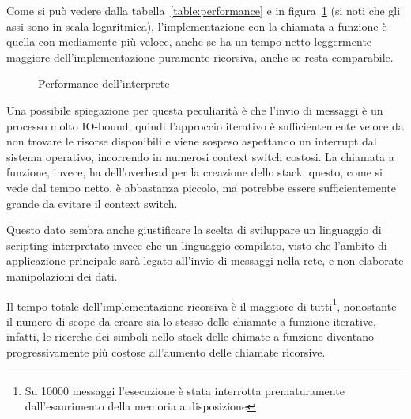 \documentclass[]{article}
\begin{document}
Come si può vedere dalla tabella~\ref{table:performance} e in figura~\ref{fig:performance-graph} (si noti che gli assi sono in scala logaritmica), l'implementazione con la chiamata a funzione è quella con mediamente più veloce, anche se ha un tempo netto leggermente maggiore dell'implementazione puramente ricorsiva, anche se resta comparabile.

\begin{figure}
	\centering
	\caption{Performance dell'interprete}
	\label{fig:performance-graph}
\end{figure}

Una possibile spiegazione per questa peculiarità è che l'invio di messaggi è un processo molto IO-bound, quindi l'approccio iterativo è sufficientemente veloce da non trovare le risorse disponibili e viene sospeso aspettando un interrupt dal sistema operativo, incorrendo in numerosi context switch costosi. La chiamata a funzione, invece, ha dell'overhead per la creazione dello stack, questo, come si vede dal tempo netto, è abbastanza piccolo, ma potrebbe essere sufficientemente grande da evitare il context switch.

Questo dato sembra anche giustificare la scelta di sviluppare un linguaggio di scripting interpretato invece che un linguaggio compilato, visto che l'ambito di applicazione principale sarà legato all'invio di messaggi nella rete, e non elaborate manipolazioni dei dati.

Il tempo totale dell'implementazione ricorsiva è il maggiore di tutti\footnote{Su 10000 messaggi l'esecuzione è stata interrotta prematuramente dall'esaurimento della memoria a disposizione}, nonostante il numero di scope da creare sia lo stesso delle chiamate a funzione iterative, infatti, le ricerche dei simboli nello stack delle chimate a funzione diventano progressivamente più costose all'aumento delle chiamate ricorsive.
\end{document}
